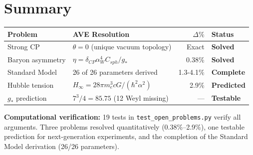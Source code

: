 \section{Summary}
\label{sec:open_problems_summary}

\begin{center}
\small
\begin{tabular}{llrl}
\toprule
\textbf{Problem} & \textbf{AVE Resolution}
& \textbf{$\Delta\%$} & \textbf{Status} \\
\midrule
Strong CP   & $\theta = 0$ (unique vacuum topology)
& Exact & \textbf{Solved} \\
Baryon asymmetry & $\eta = \delta_{CP} \alpha_W^4 C_{sph}/g_*$
& 0.38\% & \textbf{Solved} \\
Standard Model & 26 of 26 parameters derived
& 1.3-4.1\% & \textbf{Complete} \\
Hubble tension & $H_\infty = 28\pi m_e^3 cG/(\hbar^2\alpha^2)$
& 2.9\% & \textbf{Predicted} \\
$g_*$ prediction & $7^3/4 = 85.75$ (12 Weyl missing)
& --- & \textbf{Testable} \\
\bottomrule
\end{tabular}
\end{center}

\noindent
\textbf{Computational verification:} 19 tests in
\texttt{test\_open\_problems.py} verify all arguments.
Three problems resolved quantitatively (0.38\%--2.9\%), one
testable prediction for next-generation experiments, and the
completion of the Standard Model derivation (26/26 parameters).
